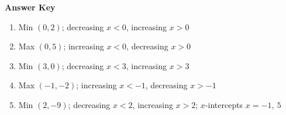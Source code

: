 \documentclass[12pt]{article}
\begin{document}
\newpage
\begin{center}{\Large\textbf{Answer Key}}\end{center}
\vspace{0.3cm}
\begin{enumerate}[label=\textbf{\arabic*.}]
\item Min $(0,2)$; decreasing $x<0$, increasing $x>0$
\item Max $(0,5)$; increasing $x<0$, decreasing $x>0$
\item Min $(3,0)$; decreasing $x<3$, increasing $x>3$
\item Max $(-1,-2)$; increasing $x<-1$, decreasing $x>-1$
\item Min $(2,-9)$; decreasing $x<2$, increasing $x>2$; $x$-intercepts $x=-1,\ 5$
\end{enumerate}
\end{document}
